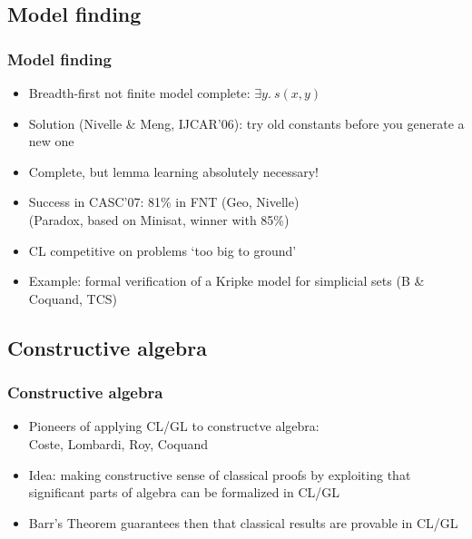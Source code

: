 \documentclass[handout,11pt]{beamer}
\newcommand{\weg}[1]{}
\begin{document}
\subsection{Model finding}

\begin{frame}
\frametitle{Model finding}
 \begin{itemize}[<+->]   %
    \item Breadth-first not finite model complete: $\exists y.~s(x,y)$
    \item Solution (Nivelle \& Meng, IJCAR'06): try old constants
    before you generate a new one
    \item Complete, but lemma learning \alert{absolutely necessary}!
    \item Success in CASC'07: 81\% in FNT (Geo, Nivelle)\\
             (Paradox, based on Minisat, winner with 85\%)
    \item CL competitive on problems `too big to ground'
    \item Example: formal verification of a Kripke model for simplicial sets (B \& Coquand, TCS)
 \end{itemize}
\end{frame}              


\weg{
\begin{frame}[label=nDPmodel]
\small
\end{frame}

\frame
  {    
    \frametitle{Model} \vspace*{-.95in}
    \scalebox{0.40}
      {
    \texttt{[image: tree\_dpe]}
      }
  }
}%

\subsection{Constructive algebra}

\begin{frame}
\frametitle{Constructive algebra}
 \begin{itemize}[<+->]   %
    \item Pioneers of applying CL/GL to constructve algebra:\\
  Coste, Lombardi, Roy, %
Coquand
    \item Idea: making constructive sense of classical proofs by
  exploiting that significant parts of algebra can be formalized in CL/GL
    \item Barr's Theorem guarantees then that classical results are provable in CL/GL
 \end{itemize}
\end{frame}
\end{document}
